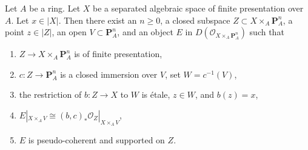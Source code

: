\begin{lemma}
\label{lemma-derived-chow}
Let $A$ be a ring. Let $X$ be a separated algebraic space
of finite presentation over $A$. Let $x \in |X|$. Then there exist
an $n \geq 0$,
a closed subspace $Z \subset X \times_A \mathbf{P}^n_A$,
a point $z \in |Z|$,
an open $V \subset \mathbf{P}^n_A$, and
an object $E$ in $D(\mathcal{O}_{X \times_A \mathbf{P}^n_A})$ such that
\begin{enumerate}
\item $Z \to X \times_A \mathbf{P}^n_A$ is of finite presentation,
\item $c : Z \to \mathbf{P}^n_A$ is a closed immersion over $V$,
set $W = c^{-1}(V)$,
\item the restriction of $b : Z \to X$ to $W$ is \'etale,
$z \in W$, and $b(z) = x$,
\item $E|_{X \times_A V} \cong
(b, c)_*\mathcal{O}_Z|_{X \times_A V}$,
\item $E$ is pseudo-coherent and supported on $Z$.
\end{enumerate}
\end{lemma}

